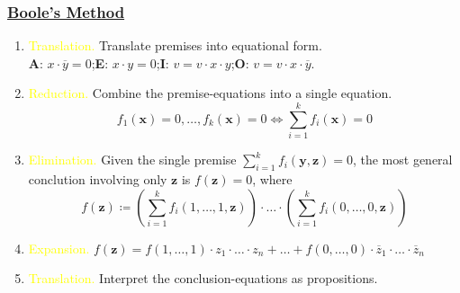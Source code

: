 \documentclass[UTF8,aspectratio=43,11pt,colorlinks,compress,openany]{beamer}%
\begin{document}
\begin{frame}\frametitle{\href{https://www.math.uwaterloo.ca/~snburris/htdocs/MYWORKS/PREPRINTS/BuSa1.pdf}{Boole's Method}}
	\begin{enumerate}
		\item \textcolor{yellow}{Translation.} Translate premises into equational form.\\
		\textbf{A}: $x\cdot\overline{y}=0$;\qquad \textbf{E}: $x\cdot y=0$;\qquad \textbf{I}: $v=v\cdot x\cdot y$;\qquad \textbf{O}: $v=v\cdot x\cdot\overline{y}$.
		\item \textcolor{yellow}{Reduction.} Combine the premise-equations into a single equation. \[f_1(\mathbf{x})=0,\dots,f_k(\mathbf{x})=0\iff \sum\limits_{i=1}^k f_i(\mathbf{x})=0\]
		\item \textcolor{yellow}{Elimination.} Given the single premise $\sum\limits_{i=1}^k f_i(\mathbf{y},\mathbf{z})=0$, the most general conclution involving only $\mathbf{z}$ is $f(\mathbf{z})=0$, where
		\[f(\mathbf{z})\coloneqq \left(\sum\limits_{i=1}^k f_i(1,\dots,1,\mathbf{z})\right)\cdot\ldots\cdot\left(\sum\limits_{i=1}^k f_i(0,\dots,0,\mathbf{z})\right)\]
		\item \textcolor{yellow}{Expansion.} $f(\mathbf{z})=f(1,\dots,1)\cdot z_1\cdot\ldots\cdot z_n+\ldots+f(0,\dots,0)\cdot\overline{z}_1\cdot\ldots\cdot\overline{z}_n$
		\item \textcolor{yellow}{Translation.} Interpret the conclusion-equations as propositions.
	\end{enumerate}
\end{frame}
\end{document}

